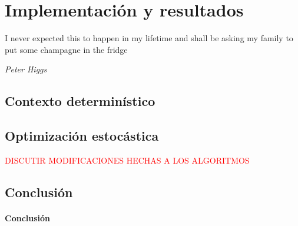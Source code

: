 \documentclass{book}
\theoremstyle{plain}
\theoremstyle{definition}
\theoremstyle{remark}
\begin{document}
\chapter{Implementación y resultados}


\epigraph{I never expected this to happen in my lifetime and shall be asking my family to put some champagne in the fridge}{\textit{Peter Higgs}}

\newpage

\section{Contexto determinístico}

\section{Optimización estocástica}

\textcolor{red}{DISCUTIR MODIFICACIONES HECHAS A LOS ALGORITMOS}

\section{Conclusión}

\subsubsection{Conclusión}
\end{document}
